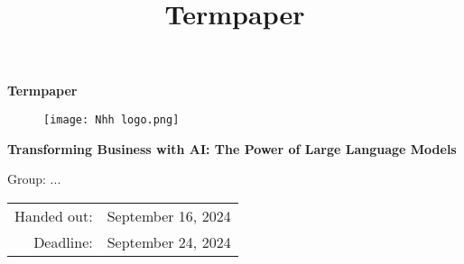 \documentclass[11pt,a4paper]{article}
\title{\textbf{Termpaper}}
\author{}
\date{}
\begin{document}
   { \centering
    \vspace*{1cm}
    
    {\Huge\bfseries Termpaper\par}
    \vspace{3cm}
    
   
   
    
    
   
    
     \begin{figure}[h]
        \centering
        \texttt{[image: Nhh logo.png]}
    
    \end{figure}

     {\Large\bfseries Transforming Business with AI: The Power of Large Language Models\par}
    \vspace{1.5cm}

    {\Large Group: ...\par}
    \vspace{1.5cm}
    
    {\large



        
    \begin{tabular}{r l}
    Handed out: & September 16, 2024 \\
    Deadline: & September 24, 2024 \\
    \end{tabular}\par}
    \vspace{2cm}
}
     
   

    \vfill


\setcounter{tocdepth}{2}
\newpage
\tableofcontents
\end{document}
